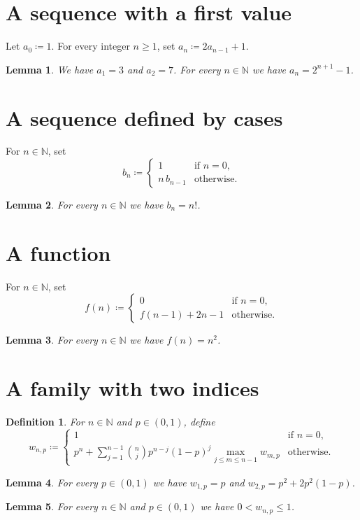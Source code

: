 \documentclass{article}
\newtheorem{lemma}{Lemma}
\newtheorem{definition}{Definition}
\begin{document}
\section{A sequence with a first value}

Let $a_0\coloneqq 1$. For every integer $n\ge1$, set $a_n\coloneqq 2a_{n-1}+1$.

\begin{lemma}\label{mersenne}
We have $a_1=3$ and $a_2=7$. For every $n\in\mathbb{N}$ we have $a_n=2^{n+1}-1$.
\end{lemma}

\section{A sequence defined by cases}

For $n\in\mathbb{N}$, set
\[ b_n\coloneqq\begin{cases}1&\text{if }n=0,\\ n\,b_{n-1}&\text{otherwise.}\end{cases}\]

\begin{lemma}\label{factorial}
For every $n\in\mathbb{N}$ we have $b_n=n!$.
\end{lemma}

\section{A function}

For $n\in\mathbb{N}$, set
\[ f(n)\coloneqq\begin{cases}0&\text{if }n=0,\\ f(n-1)+2n-1&\text{otherwise.}\end{cases}\]

\begin{lemma}\label{squares}
For every $n\in\mathbb{N}$ we have $f(n)=n^2$.
\end{lemma}

\section{A family with two indices}

\begin{definition}\label{coins}
For $n\in\mathbb{N}$ and $p\in(0,1)$, define
\[ w_{n,p}\coloneqq\begin{cases}1&\text{if }n=0,\\ p^n+\sum_{j=1}^{n-1}\binom{n}{j}p^{n-j}(1-p)^{j}\max_{j\le m\le n-1}w_{m,p}&\text{otherwise.}\end{cases}\]
\end{definition}

\begin{lemma}\label{first}
For every $p\in(0,1)$ we have $w_{1,p}=p$ and $w_{2,p}=p^2+2p^2(1-p)$.
\end{lemma}

\begin{lemma}\label{bounded}
For every $n\in\mathbb{N}$ and $p\in(0,1)$ we have $0<w_{n,p}\le1$.
\end{lemma}
\end{document}

